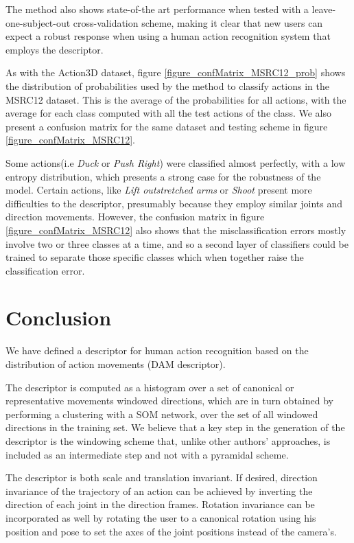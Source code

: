 \documentclass{fcs}
\begin{document}
The method also shows state-of-the art performance when tested with a leave-one-subject-out cross-validation scheme, making it clear that new users can expect a robust response when using a human action recognition system that employs the descriptor.






As with the Action3D dataset, figure \ref{figure_confMatrix_MSRC12_prob} shows the distribution of probabilities used by the method to classify actions in the MSRC12 dataset. This is the average of the probabilities for all actions, with the average for each class computed with all the test actions of the class. We also present a confusion matrix for the same dataset and testing scheme in figure \ref{figure_confMatrix_MSRC12}. 

Some actions(i.e \textit{Duck} or \textit{Push Right}) were classified almost perfectly, with a low entropy distribution, which presents a strong case for the robustness of the model. Certain actions, like \textit{Lift outstretched arms} or \textit{Shoot} present more difficulties to the descriptor, presumably because they employ similar joints and direction movements. However, the confusion matrix in figure \ref{figure_confMatrix_MSRC12} also shows that the misclassification errors mostly involve two or three classes at a time, and so a second layer of classifiers could be trained to separate those specific classes which when together raise the classification error.

%
 
  
\section{Conclusion}
\label{conclusion}

We have defined a descriptor for human action recognition based on the distribution of action movements (DAM descriptor). 

The descriptor is computed as a histogram over a set of canonical or representative movements windowed directions, which are in turn obtained by performing a clustering with a SOM network,  over the set of all windowed directions in the training set. We believe that a key step in the generation of the descriptor is the windowing scheme that, unlike other authors' approaches, is included as an intermediate step and not with a pyramidal scheme.

The descriptor is both scale and translation invariant.  If desired,  direction invariance of the trajectory of an action can be achieved by inverting the direction of each joint in the direction frames. Rotation invariance can be incorporated as well by rotating the user to a canonical rotation using his position and pose to set the axes of the joint positions instead of the camera's. 
\end{document}
